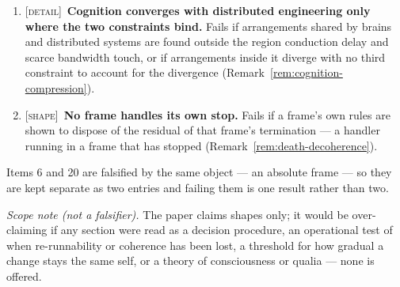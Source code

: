 \documentclass[11pt,a4paper]{article}
\theoremstyle{remark}\newtheorem{remark}[definition]{Remark}
\begin{document}
\begin{enumerate}[leftmargin=*]
boundary --- is nevertheless transparent to itself, which would make transparency a property of
self-models as such rather than of a configuration (Remark~\ref{rem:transparency}).
\item \textsc{[detail]}~\textbf{Cognition converges with distributed engineering only where the two
constraints bind.} Fails if arrangements shared by brains and distributed systems are found outside
the region conduction delay and scarce bandwidth touch, or if arrangements inside it diverge with no
third constraint to account for the divergence (Remark~\ref{rem:cognition-compression}).
\item \textsc{[shape]}~\textbf{No frame handles its own stop.} Fails if a frame's own rules are shown
to dispose of the residual of that frame's termination --- a handler running in a frame that has
stopped (Remark~\ref{rem:death-decoherence}).
\end{enumerate}

\noindent Items 6 and 20 are falsified by the same object --- an absolute frame --- so they are kept
separate as two entries and failing them is one result rather than two.

\medskip
\noindent\emph{Scope note (not a falsifier).} The paper claims shapes only; it would be
over-claiming if any section were read as a decision procedure, an operational test of when
re-runnability or coherence has been lost, a threshold for how gradual a change stays
the same self, or a theory of consciousness or qualia --- none is offered.
\end{document}
